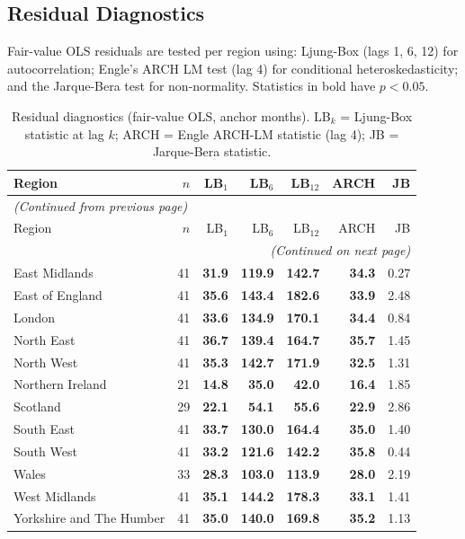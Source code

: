 \documentclass[11pt,a4paper]{article}
\theoremstyle{plain}
\theoremstyle{definition}
\begin{document}
\subsection{Residual Diagnostics}\label{sec:resid}

Fair-value OLS residuals are tested per region using:
Ljung-Box (lags 1, 6, 12) for autocorrelation;
Engle's ARCH LM test (lag 4) for conditional heteroskedasticity;
and the Jarque-Bera test for non-normality.
Statistics in bold have $p < 0.05$.

\begin{longtable}{lrrrrrr}
\caption{Residual diagnostics (fair-value OLS, anchor months).
LB$_k$ = Ljung-Box statistic at lag $k$;
ARCH = Engle ARCH-LM statistic (lag 4);
JB = Jarque-Bera statistic.}\label{tab:diag}\\
\toprule
Region & $n$ & LB$_1$ & LB$_6$ & LB$_{12}$ & ARCH & JB \\
\midrule
\endfirsthead
\multicolumn{7}{l}{\small\itshape(Continued from previous page)}\\
\toprule
Region & $n$ & LB$_1$ & LB$_6$ & LB$_{12}$ & ARCH & JB \\
\midrule
\endhead
\midrule
\multicolumn{7}{r}{\small\itshape(Continued on next page)}\\
\endfoot
\bottomrule
\endlastfoot
East Midlands            & 41 & \textbf{31.9} & \textbf{119.9} & \textbf{142.7} & \textbf{34.3} & 0.27 \\
East of England          & 41 & \textbf{35.6} & \textbf{143.4} & \textbf{182.6} & \textbf{33.9} & 2.48 \\
London                   & 41 & \textbf{33.6} & \textbf{134.9} & \textbf{170.1} & \textbf{34.4} & 0.84 \\
North East               & 41 & \textbf{36.7} & \textbf{139.4} & \textbf{164.7} & \textbf{35.7} & 1.45 \\
North West               & 41 & \textbf{35.3} & \textbf{142.7} & \textbf{171.9} & \textbf{32.5} & 1.31 \\
Northern Ireland         & 21 & \textbf{14.8} & \textbf{35.0}  & \textbf{42.0}  & \textbf{16.4} & 1.85 \\
Scotland                 & 29 & \textbf{22.1} & \textbf{54.1}  & \textbf{55.6}  & \textbf{22.9} & 2.86 \\
South East               & 41 & \textbf{33.7} & \textbf{130.0} & \textbf{164.4} & \textbf{35.0} & 1.40 \\
South West               & 41 & \textbf{33.2} & \textbf{121.6} & \textbf{142.2} & \textbf{35.8} & 0.44 \\
Wales                    & 33 & \textbf{28.3} & \textbf{103.0} & \textbf{113.9} & \textbf{28.0} & 2.19 \\
West Midlands            & 41 & \textbf{35.1} & \textbf{144.2} & \textbf{178.3} & \textbf{33.1} & 1.41 \\
Yorkshire and The Humber & 41 & \textbf{35.0} & \textbf{140.0} & \textbf{169.8} & \textbf{35.2} & 1.13 \\
\end{longtable}
\end{document}
